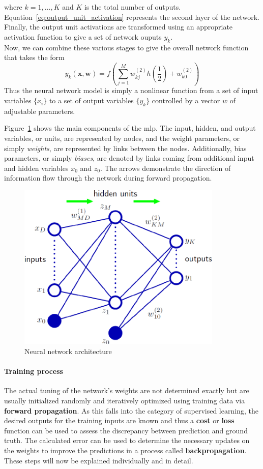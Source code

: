where $ k = 1, \dots, K $ and $ K $ is the total number of outputs. Equation~\ref{eq:output_unit_activation} represents the second layer of the network. Finally, the output unit activations are transformed using an appropriate activation function to give a set of network ouputs $ y_k $. \\
Now, we can combine these various stages to give the overall network function that takes the form
\begin{equation}
	y_k(\boldsymbol{x}, \boldsymbol{w}) = f \left( \sum_{j=1}^{M} w_{kj}^{(2)} h \left( \frac{1}{2} \right) + w_{k0}^{(2)} \right)
\end{equation}
Thus the neural network model is simply a nonlinear function from a set of input variables $ \{x_i\} $ to a set of output variables $ \{y_k\} $ controlled by a vector $ w $ of adjustable parameters.

Figure~\ref{fig:neural_network_architecture} shows the main components of the \gls{mlp}. The input, hidden, and output variables, or units, are represented by nodes, and the weight parameters, or simply \textit{weights}, are represented by links between the nodes. Additionally, bias parameters, or simply \textit{biases}, are denoted by links coming from additional input and hidden variables $ x_0 $ and $ z_0 $. The arrows demonstrate the direction of information flow through the network during forward propagation.
\begin{figure}
	\includegraphics[height=8cm]{img/neural_network_structure}
	\caption{Neural network architecture}
	\label{fig:neural_network_architecture}
\end{figure}

\paragraph{Training process}\label{par:training_process}
The actual tuning of the network's weights are not determined exactly but are usually initialized randomly and iteratively optimized using training data via \textbf{forward propagation}. As this falls into the category of supervised learning, the desired outputs for the training inputs are known and thus a \textbf{cost} or \textbf{loss} function can be used to assess the discrepancy between prediction and ground truth. The calculated error can be used to determine the necessary updates on the weights to improve the predictions in a process called \textbf{backpropagation}. These steps will now be explained individually and in detail.

